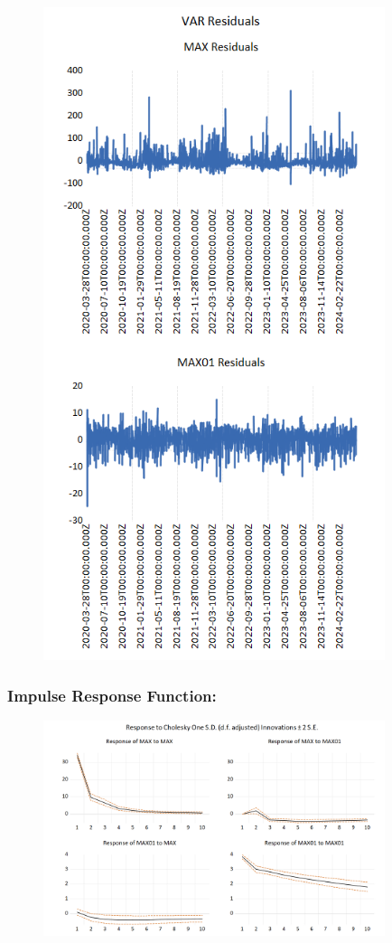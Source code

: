 \documentclass{article} %
\begin{document}
\begin{figure}[H]
    \centering
    \includegraphics[width=10cm]{images/image21.png}
\end{figure}

\subsubsection*{Impulse Response Function:} 

\begin{figure}[H]
    \centering
    \includegraphics[width=10cm]{images/image18.png}
\end{figure}
\end{document}
